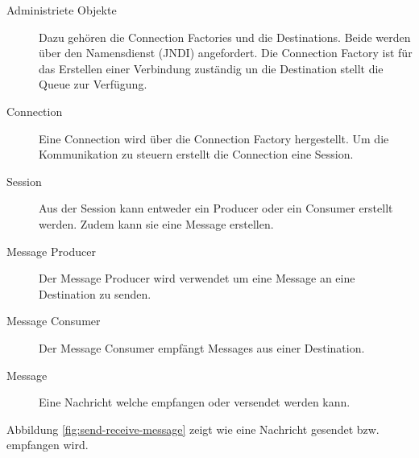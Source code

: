 \begin{description}
	\item[Administriete Objekte] Dazu gehören die Connection Factories und die Destinations. Beide werden über den Namensdienst (JNDI) angefordert. Die Connection Factory ist für das Erstellen einer Verbindung zuständig un die Destination stellt die Queue zur Verfügung.
	\item[Connection] Eine Connection wird über die Connection Factory hergestellt. Um die Kommunikation zu steuern erstellt die Connection eine Session.
	\item[Session] Aus der Session kann entweder ein Producer oder ein Consumer erstellt werden. Zudem kann sie eine Message erstellen.
	\item[Message Producer] Der Message Producer wird verwendet um eine Message an eine Destination zu senden.
	\item[Message Consumer] Der Message Consumer empfängt Messages aus einer Destination.
	\item[Message] Eine Nachricht welche empfangen oder versendet werden kann. 
\end{description}

Abbildung \ref{fig:send-receive-message} zeigt wie eine Nachricht gesendet bzw. empfangen wird.


